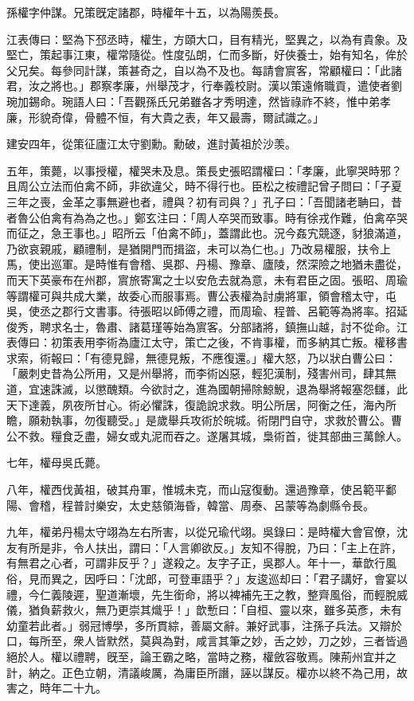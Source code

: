 
\begin{pinyinscope}
孫權字仲謀。兄策旣定諸郡，時權年十五，以為陽羨長。

江表傳曰：堅為下邳丞時，權生，方頤大口，目有精光，堅異之，以為有貴象。及堅亡，策起事江東，權常隨從。性度弘朗，仁而多斷，好俠養士，始有知名，侔於父兄矣。每參同計謀，策甚奇之，自以為不及也。每請會賔客，常顧權曰：「此諸君，汝之將也。」郡察孝廉，州舉茂才，行奉義校尉。漢以策遠脩職貢，遣使者劉琬加錫命。琬語人曰：「吾觀孫氏兄弟雖各才秀明達，然皆祿祚不終，惟中弟孝廉，形貌奇偉，骨體不恒，有大貴之表，年又最壽，爾試識之。」

建安四年，從策征廬江太守劉勳。勳破，進討黃祖於沙羡。

五年，策薨，以事授權，權哭未及息。策長史張昭謂權曰：「孝廉，此寧哭時邪？且周公立法而伯禽不師，非欲違父，時不得行也。臣松之桉禮記曾子問曰：「子夏三年之喪，金革之事無避也者，禮與？初有司與？」孔子曰：「吾聞諸老聃曰，昔者魯公伯禽有為為之也。」鄭玄注曰：「周人卒哭而致事。時有徐戎作難，伯禽卒哭而征之，急王事也。」昭所云「伯禽不師」，蓋謂此也。況今姦宄競逐，豺狼滿道，乃欲哀親戚，顧禮制，是猶開門而揖盜，未可以為仁也。」乃改易權服，扶令上馬，使出巡軍。是時惟有會稽、吳郡、丹楊、豫章、廬陵，然深險之地猶未盡從，而天下英豪布在州郡，賔旅寄寓之士以安危去就為意，未有君臣之固。張昭、周瑜等謂權可與共成大業，故委心而服事焉。曹公表權為討虜將軍，領會稽太守，屯吳，使丞之郡行文書事。待張昭以師傅之禮，而周瑜、程普、呂範等為將率。招延俊秀，聘求名士，魯肅、諸葛瑾等始為賔客。分部諸將，鎮撫山越，討不從命。江表傳曰：初策表用李術為廬江太守，策亡之後，不肯事權，而多納其亡叛。權移書求索，術報曰：「有德見歸，無德見叛，不應復還。」權大怒，乃以狀白曹公曰：「嚴刺史昔為公所用，又是州舉將，而李術凶惡，輕犯漢制，殘害州司，肆其無道，宜速誅滅，以懲醜類。今欲討之，進為國朝掃除鯨鯢，退為舉將報塞怨讎，此天下達義，夙夜所甘心。術必懼誅，復詭說求救。明公所居，阿衡之任，海內所瞻，願勑執事，勿復聽受。」是歲舉兵攻術於皖城。術閉門自守，求救於曹公。曹公不救。糧食乏盡，婦女或丸泥而吞之。遂屠其城，梟術首，徙其部曲三萬餘人。

七年，權母吳氏薨。

八年，權西伐黃祖，破其舟軍，惟城未克，而山寇復動。還過豫章，使呂範平鄱陽、會稽，程普討樂安，太史慈領海昏，韓當、周泰、呂蒙等為劇縣令長。

九年，權弟丹楊太守翊為左右所害，以從兄瑜代翊。吳錄曰：是時權大會官僚，沈友有所是非，令人扶出，謂曰：「人言卿欲反。」友知不得脫，乃曰：「主上在許，有無君之心者，可謂非反乎？」遂殺之。友字子正，吳郡人。年十一，華歆行風俗，見而異之，因呼曰：「沈郎，可登車語乎？」友逡巡却曰：「君子講好，會宴以禮，今仁義陵遲，聖道漸壞，先生銜命，將以裨補先王之教，整齊風俗，而輕脫威儀，猶負薪救火，無乃更崇其熾乎！」歆慙曰：「自桓、靈以來，雖多英彥，未有幼童若此者。」弱冠博學，多所貫綜，善屬文辭。兼好武事，注孫子兵法。又辯於口，每所至，衆人皆默然，莫與為對，咸言其筆之妙，舌之妙，刀之妙，三者皆過絕於人。權以禮聘，旣至，論王霸之略，當時之務，權斂容敬焉。陳荊州宜并之計，納之。正色立朝，清議峻厲，為庸臣所譖，誣以謀反。權亦以終不為己用，故害之，時年二十九。


\end{pinyinscope}
